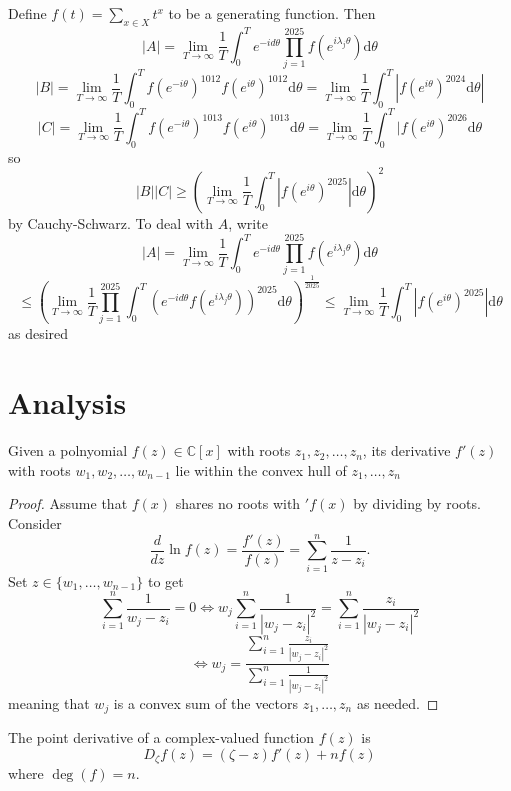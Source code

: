 \documentclass[11pt]{scrartcl}
\theoremstyle{plain} %
\theoremstyle{definition}
\theoremstyle{remark}
\theoremstyle{empty}
\theoremstyle{empty}
\theoremstyle{empty}
\theoremstyle{empty}
\theoremstyle{empty}
\theoremstyle{empty}
\theoremstyle{empty}
\begin{document}
\begin{solution}
Define $f(t) = \sum_{x\in X} t^x$ to be a generating function. Then \[|A| = \lim_{T \to \infty} \frac{1}{T} \int_0^T e^{-id\theta} \prod_{j=1}^{2025} f(e^{i\lambda_j \theta}) \mathrm d\theta\] \[|B| = \lim_{T \to \infty} \frac{1}{T} \int_0^T f(e^{-i\theta})^{1012}f(e^{i\theta})^{1012} \mathrm d\theta = \lim_{T \to \infty} \frac{1}{T} \int_0^T |f(e^{i\theta})^{2024} \mathrm d\theta|\] \[|C| = \lim_{T \to \infty} \frac{1}{T} \int_0^T f(e^{-i\theta})^{1013}f(e^{i\theta})^{1013} \mathrm d\theta = \lim_{T \to \infty} \frac{1}{T} \int_0^T |f(e^{i\theta})^{2026} \mathrm d\theta\] so 
\[|B||C| \ge \left (\lim_{T \to \infty}\frac{1}{T} \int_0^T |f(e^{i\theta})^{2025}| \mathrm d\theta \right )^2\] by Cauchy-Schwarz. To deal with $A$, write \[|A| = \lim_{T \to \infty} \frac{1}{T} \int_0^T e^{-id\theta} \prod_{j=1}^{2025} f(e^{i\lambda_j \theta}) \mathrm d\theta\] \[ \le \left ( \lim_{T \to \infty} \frac{1}{T} \prod_{j=1}^{2025} \int_0^T \left ( e^{-id\theta} f(e^{i\lambda_j \theta})\right )^{2025} \mathrm d\theta \right )^{\frac{1}{2025}} \le \lim_{T \to \infty}\frac{1}{T} \int_0^T |f(e^{i\theta})^{2025}| \mathrm d\theta\] as desired
\end{solution}


\section{Analysis}

\begin{theorem}
Given a polnyomial $f(z) \in \mathbb C[x]$ with roots $z_1, z_2, \ldots, z_n$, its derivative $f'(z)$ with roots $w_1, w_2, \ldots, w_{n-1}$ lie within the convex hull of $z_1, \ldots, z_n$
\end{theorem}

\begin{proof}
  Assume that $f(x)$ shares no roots with $'f(x)$ by dividing by roots. Consider \[\frac{d}{dz} \ln f(z) = \frac{f'(z)}{f(z)} = \sum_{i=1}^n \frac{1}{z - z_i}.\] Set $z \in \{w_1, \ldots, w_{n-1}\}$ to get \[\sum_{i=1}^{n} \frac{1}{w_j-z_i} = 0 \iff w_j\sum_{i=1}^n \frac{1}{|w_j-z_i|^2}=\sum_{i=1}^n \frac{z_i}{|w_j-z_i|^2}\] \[\iff w_j = \frac{\sum_{i=1}^n \frac{z_i}{|w_j-z_i|^2}}{\sum_{i=1}^n \frac{1}{|w_j-z_i|^2}}\] meaning that $w_j$ is a convex sum of the vectors $z_1, \ldots, z_n$ as needed. 
\end{proof}

\begin{definition}
  The point derivative of a complex-valued function $f(z)$ is \[D_\zeta f(z) = (\zeta - z)f'(z) + nf(z)\] where $\deg(f) = n$.
\end{definition}
\end{document}
